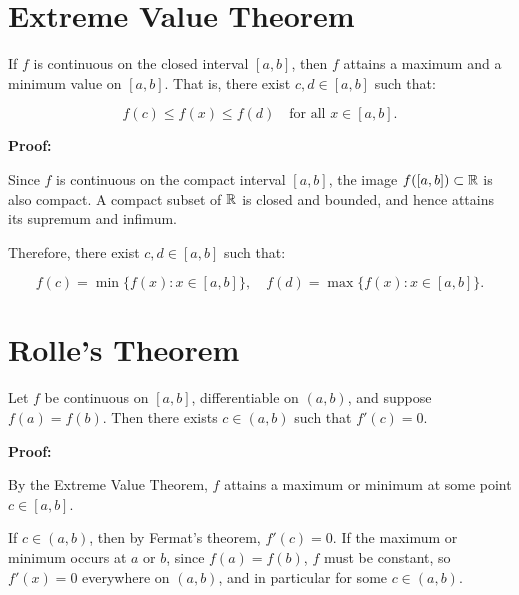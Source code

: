 \section{Extreme Value Theorem}

If \(f\) is continuous on the closed interval \([a, b] \), then \(f\) attains a maximum and a 
minimum value on \([a, b]\). That is, there exist \( c, d \in [a, b] \) such that:

\[
    f(c) \le f(x) \le f(d) \quad \text{for all } x \in [a, b].
\]

\textbf{Proof:}  

Since \(f\) is continuous on the compact interval \([a, b]\), the image \( f([a, b]) \subset \mathbb{R} \) 
is also compact. A compact subset of \( \mathbb{R} \) is closed and bounded, and hence 
attains its supremum and infimum.

Therefore, there exist \( c, d \in [a, b] \) such that:

\[
    f(c) = \min\{f(x): x \in [a, b]\}, \quad
    f(d) = \max\{f(x): x \in [a, b]\}.
\]

\QED

\section{Rolle’s Theorem}
Let \(f\) be continuous on \([a, b] \), differentiable on \((a, b) \), and suppose \( f(a) = f(b) \).  
Then there exists \( c \in (a, b) \) such that \( f'(c) = 0 \).

\textbf{Proof:}  

By the Extreme Value Theorem, \(f\) attains a maximum or minimum at some point \( c \in [a, b] \).

If \( c \in (a, b) \), then by Fermat’s theorem, \( f'(c) = 0 \).  
If the maximum or minimum occurs at \(a\) or \(b\), since \( f(a) = f(b) \), \(f\) must be 
constant, so \( f'(x) = 0 \) everywhere on \((a, b)\), and in particular for some \( c \in (a, b) \).

\QED

\begin{center}
\end{center}

